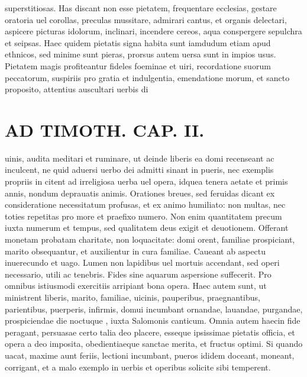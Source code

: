 \documentclass{article}
\begin{document}
\begin{pages}
superstitiosas. Has discant non esse pietatem, frequentare ecclesias, gestare oratoria uel corollas, preculas mussitare, admirari cantus, et organis delectari, aspicere picturas idolorum, inclinari, incendere cereos, aqua conspergere sepulchra et seipsas. Haec quidem pietatis signa habita sunt iamdudum etiam apud ethnicos, sed minime sunt pieras, prorsus autem uersa sunt in impios usus. Pietatem magis profiteantur fideles foeminae et uiri, recordatione suorum peccatorum, suspiriis pro gratia et indulgentia, emendatione morum, et sancto proposito, attentius auscultari uerbis di\pend
\section*{AD TIMOTH. CAP. II. }
\marginpar{[ p.487 ]}\pstart uinis, audita meditari et ruminare, ut deinde liberis ea domi recenseant ac inculcent, ne quid aduersi uerbo dei admitti sinant in pueris, nec exemplis propriis in citent ad irreligiosa uerba uel opera, idquea tenera aetate et primis annis, nondum deprauatis animis. Orationes breues, sed feruidas dicant ex consideratione necessitatum profusas, et ex animo humiliato: non multas, nec toties repetitas pro more et praefixo numero. Non enim quantitatem precum iuxta numerum et tempus, sed qualitatem deus exigit et deuotionem. Offerant monetam probatam charitate, non loquacitate: domi orent, familiae prospiciant, marito obsequantur, et auxilientur in cura familiae. Caueant ab aspectu inuerecundo et uago. Lumen non lapidibus uel mortuis accendant, sed operi necessario, utili ac tenebris. Fides sine aquarum aspersione suffecerit. Pro omnibus istiusmodi exercitiis arripiant bona opera. Haec autem sunt, ut ministrent liberis, marito, familiae, uicinis, pauperibus, praegnantibus, parientibus, puerperis, infirmis, domui incumbant ornandae, lauandae, purgandae, prospiciendae die noctuque , iuxta Salomonis canticum. Omnia autem haecin fide peragant, persuasae certo talia deo placere, esseque  ipsissimae pietatis officia, et opera a deo imposita, obedientiaeque  sanctae merita, et fructus optimi. Si quando uacat, maxime aunt feriis, lectioni incumbant, pueros ididem doceant, moneant, corrigant, et a malo exemplo in uerbis et operibus solicite sibi temperent.  \pend
{}
{}

\end{pages}
\end{document}
